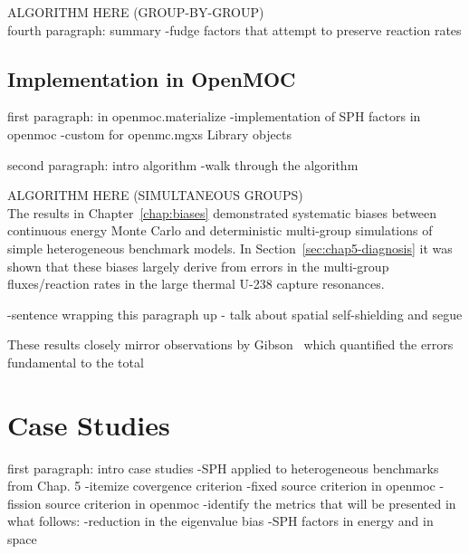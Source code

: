
ALGORITHM HERE (GROUP-BY-GROUP)\\

fourth paragraph: summary
-fudge factors that attempt to preserve reaction rates


\subsection{Implementation in OpenMOC}
\label{subsec:chap6-sph-openmoc}

first paragraph: in openmoc.materialize
-implementation of SPH factors in openmoc
-custom for openmc.mgxs Library objects

second paragraph: intro algorithm
-walk through the algorithm

ALGORITHM HERE (SIMULTANEOUS GROUPS)\\


The results in Chapter~\ref{chap:biases} demonstrated systematic biases between continuous energy Monte Carlo and deterministic multi-group simulations of simple heterogeneous benchmark models. In Section~\ref{sec:chap5-diagnosis} it was shown that these biases largely derive from errors in the multi-group fluxes/reaction rates in the large thermal U-238 capture resonances. 

-sentence wrapping this paragraph up - talk about spatial self-shielding and segue

These results closely mirror observations by Gibson~\cite{gibson2016thesis} which quantified the errors fundamental to the total 


\section{Case Studies}
\label{sec:chap6-sph-case-studies}

first paragraph: intro case studies
-SPH applied to heterogeneous benchmarks from Chap. 5
-itemize covergence criterion
-fixed source criterion in openmoc
-fission source criterion in openmoc
-identify the metrics that will be presented in what follows:
  -reduction in the eigenvalue bias
  -SPH factors in energy and in space

